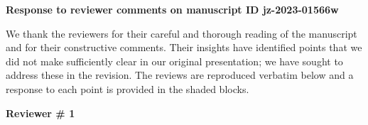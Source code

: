 \documentclass[answers,12pt]{exam}
\begin{document}
\centerline{\textbf{Response to reviewer comments on manuscript ID jz-2023-01566w}}\vspace{1em}

\noindent We thank the reviewers for their careful and thorough reading of the manuscript and for their constructive comments. Their insights have identified points that we did not make sufficiently clear in our original presentation; we have sought to address these in the revision. The reviews are reproduced verbatim below and a response to each point is provided in the shaded blocks. \vspace{2em}


\textbf{Reviewer \# 1}
\end{document}
